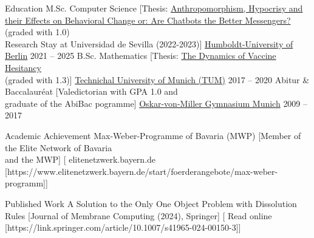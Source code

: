 \documentclass[
]{../llresume}
\begin{document}
\makeheader

\begin{mainpane}
    \begin{mainsection}{Education}
        \entryJob
            {M.Sc. Computer Science}
            [Thesis: \href{https://julienandco.github.io/masters_thesis/thesis.pdf}{Anthropomorphism, Hypocrisy and their Effects on Behavioral Change or: Are
            Chatbots the Better Messengers?} (graded with 1.0)\\Research Stay at Universidad de Sevilla (2022-2023)]
            {\href{https://www.informatik.hu-berlin.de/de/studium/Master/Master}{Humboldt-University of Berlin}}
            {2021 -- 2025}
        \entryJob
            {B.Sc. Mathematics}
            [Thesis: \href{https://julienandco.github.io/the-dynamics-of-vaccine-hesitancy/bachelor_thesis_julien_caselmann.pdf}{The Dynamics of Vaccine Hesitancy}\\(graded with 1.3)]
            {\href{https://www.ma.tum.de/}{Technichal University of Munich (TUM)}}
            {2017 -- 2020}
        \entryJob
            {Abitur \& Baccalauréat}
            [Valedictorian with GPA 1.0 and\\graduate of the AbiBac pogramme]
            {\href{https://www.ovmg.de/}{Oskar-von-Miller Gymnasium Munich}}
            {2009 -- 2017}
    \end{mainsection}

    \begin{mainsection}{Academic Achievement}
        \entryGeneric
            {Max-Weber-Programme of Bavaria (MWP)} 
            [Member of the Elite Network of Bavaria\\and the MWP]
            [\infoHomepage
                {elitenetzwerk.bayern.de}
                [https://www.elitenetzwerk.bayern.de/start/foerderangebote/max-weber-programm]]
    \end{mainsection}

    \begin{mainsection}{Published Work}
        \entryGeneric
            {A Solution to the Only One Object Problem with Dissolution Rules}
            [Journal of Membrane Computing (2024), Springer]
            [\infoHomepage
                {Read online}
                [https://link.springer.com/article/10.1007/s41965-024-00150-3]]
    \end{mainsection}


\end{mainpane}
\end{document}
